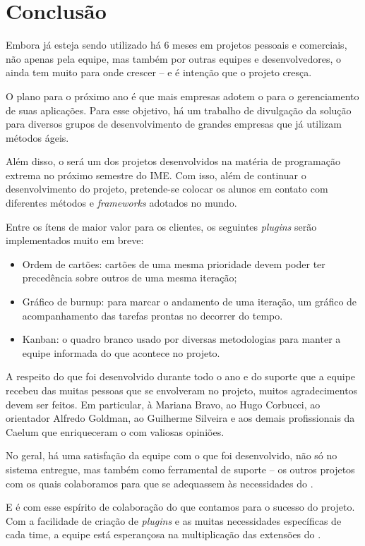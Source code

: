 \section{Conclusão}

Embora já esteja sendo utilizado há 6 meses em projetos pessoais e comerciais, não apenas pela equipe, mas também por outras equipes e desenvolvedores, o \calopsita{} ainda tem muito para onde crescer -- e é intenção que o projeto cresça.

O plano para o próximo ano é que mais empresas adotem o \calopsita{} para o gerenciamento de suas aplicações. Para esse objetivo, há um trabalho de divulgação da solução para diversos grupos de desenvolvimento de grandes empresas que já utilizam métodos ágeis.

Além disso, o \calopsita{} será um dos projetos desenvolvidos na matéria de programação extrema no próximo semestre do IME. Com isso, além de continuar o desenvolvimento do projeto, pretende-se colocar os alunos em contato com diferentes métodos e \textit{frameworks} adotados no mundo.

Entre os ítens de maior valor para os clientes, os seguintes \textit{plugins} serão implementados muito em breve:

\begin{itemize}
	\item{Ordem de cartões: cartões de uma mesma prioridade devem poder ter precedência sobre outros de uma mesma iteração;}
	\item{Gráfico de burnup: para marcar o andamento de uma iteração, um gráfico de acompanhamento das tarefas prontas no decorrer do tempo.}
	\item{Kanban: o quadro branco usado por diversas metodologias para manter a equipe informada do que acontece no projeto.}
\end{itemize}

A respeito do que foi desenvolvido durante todo o ano e do suporte que a equipe recebeu das muitas pessoas que se envolveram no projeto, muitos agradecimentos devem ser feitos. Em particular, à Mariana Bravo, ao Hugo Corbucci, ao orientador Alfredo Goldman, ao Guilherme Silveira e aos demais profissionais da Caelum que enriqueceram o \calopsita{} com valiosas opiniões. 

No geral, há uma satisfação da equipe com o que foi desenvolvido, não só no sistema entregue, mas também como ferramental de suporte -- os outros projetos \opensource com os quais colaboramos para que se adequassem às necessidades do \calopsita{}.

E é com esse espírito de colaboração do \opensource que contamos para o sucesso do projeto. Com a facilidade de criação de \textit{plugins} e as muitas necessidades específicas de cada time, a equipe está esperançosa na multiplicação das extensões do \calopsita{}.

